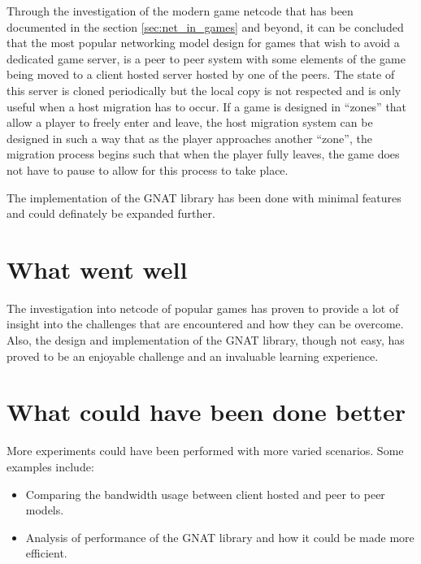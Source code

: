 Through the investigation of the modern game netcode that has been documented in the section \ref{sec:net_in_games} and beyond, it can be concluded that the most popular networking model design for games that wish to avoid a dedicated game server, is a peer to peer system with some elements of the game being moved to a client hosted server hosted by one of the peers. The state of this server is cloned periodically but the local copy is not respected and is only useful when a host migration has to occur. If a game is designed in ``zones'' that allow a player to freely enter and leave, the host migration system can be designed in such a way that as the player approaches another ``zone'', the migration process begins such that when the player fully leaves, the game does not have to pause to allow for this process to take place.

The implementation of the GNAT library has been done with minimal features and could definately be expanded further.


\section{What went well}
The investigation into netcode of popular games has proven to provide a lot of insight into the challenges that are encountered and how they can be overcome. Also, the design and implementation of the GNAT library, though not easy, has proved to be an enjoyable challenge and an invaluable learning experience.


\section{What could have been done better}
More experiments could have been performed with more varied scenarios. Some examples include:
\begin{itemize}
\item Comparing the bandwidth usage between client hosted and peer to peer models.
\item Analysis of performance of the GNAT library and how it could be made more efficient.
\end{itemize}


